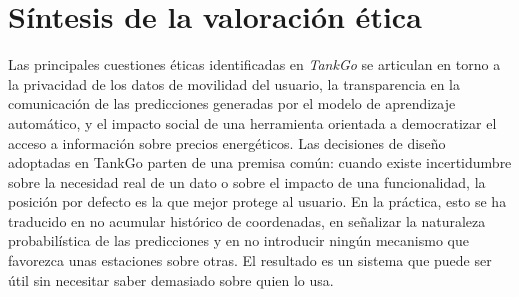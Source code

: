 \section{Síntesis de la valoración ética}
\label{sec:etica-sintesis}

Las principales cuestiones éticas identificadas en \textit{TankGo} se articulan en torno
a la privacidad de los datos de movilidad del usuario, la transparencia en la comunicación
de las predicciones generadas por el modelo de aprendizaje automático, y el impacto social
de una herramienta orientada a democratizar el acceso a información sobre precios energéticos.
Las decisiones de diseño adoptadas en TankGo parten de una premisa común:
cuando existe incertidumbre sobre la necesidad real de un dato o sobre el
impacto de una funcionalidad, la posición por defecto es la que mejor protege
al usuario. En la práctica, esto se ha traducido en no acumular histórico de
coordenadas, en señalizar la naturaleza probabilística de las
predicciones y en no introducir ningún mecanismo que favorezca unas
estaciones sobre otras. El resultado es un sistema que puede ser útil sin
necesitar saber demasiado sobre quien lo usa.